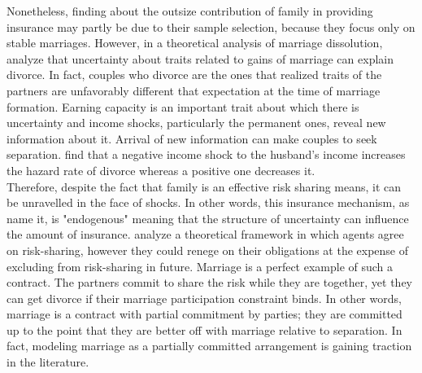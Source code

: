 Nonetheless, \citet{Blundell_etal_2015_Con-Ineq} finding about the outsize contribution of family in providing insurance
may partly be due to their sample selection, because they focus only on stable marriages. However, in a theoretical analysis of marriage dissolution, \citet{Becker_etal_1977} analyze that uncertainty about traits related to gains of marriage can explain divorce. In fact, couples who divorce are the ones that realized traits of the partners are unfavorably different that expectation at the time of marriage formation. Earning capacity is an important trait about which there is uncertainty and income shocks, particularly the permanent ones, reveal new information about it. Arrival of new information can make couples to seek separation. \citet{Weiss_Willis_1997} find that a negative income shock to the husband's income increases the hazard rate of divorce whereas a positive one decreases it.  \\

Therefore, despite the fact that family is an effective risk sharing means, it can be unravelled in the face of shocks. In other words, this insurance mechanism, as \citet{Krueger_Perri_2006_RES} name it, is "endogenous" meaning that the structure of uncertainty can influence the amount of insurance. \citet{Krueger_Perri_2006_RES} analyze a theoretical framework in which agents agree on risk-sharing, however they could renege on their obligations at the expense of excluding from risk-sharing in future. Marriage is a perfect example of such a contract. The partners commit to share the risk while they are together, yet they can get divorce if their marriage participation constraint binds. In other words, marriage is a contract with partial commitment by parties; they are committed up to the point that they are better off with marriage relative to separation. In fact, modeling marriage as a partially committed arrangement is gaining traction in the literature. \citep{Chiappori_Mazzocco_2014,  Mazzocco_etal_2013}   \\

